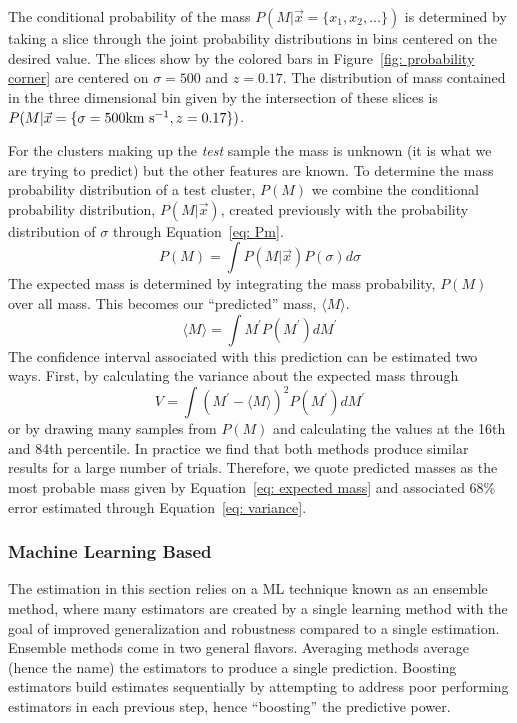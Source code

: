 \documentclass[fleqn,usenatbib]{mnras}
\begin{document}
The conditional probability of the mass $P(M|\vec{x}= \{ x_1,x_2,...\})$ is determined by taking a slice through the joint probability distributions in bins centered on the desired value. The slices show by the colored bars in Figure~\ref{fig: probability corner} are centered on $\sigma = 500$ \kms and $z=0.17$. The distribution of mass contained in the three dimensional bin given by the intersection of these slices is $P(M|\vec{x} = \{ \sigma=500 \hbox{km~s$^{-1}$},z=0.17\})$.

For the clusters making up the \emph{test} sample the mass is unknown (it is what we are trying to predict) but the other features are known. To determine the mass probability distribution of a test cluster, $P(M)$ we combine the conditional probability distribution, $P(M|\vec{x})$, created previously with the probability distribution of $\sigma$ through Equation~\ref{eq: Pm}.
\begin{equation}\label{eq: Pm}
	P(M) = \int P(M|\vec{x}) P(\sigma) d\sigma
\end{equation}
The expected mass is determined by integrating the mass probability, $P(M)$ over all mass. This becomes our ``predicted'' mass, $\langle M\rangle$.
\begin{equation}\label{eq: expected mass}
	\langle M\rangle = \int M^\prime P(M^\prime)dM^\prime
\end{equation}
The confidence interval associated with this prediction can be estimated two ways. First, by calculating the variance about the expected mass through
\begin{equation}\label{eq: variance}
	V = \int (M^\prime - \langle M\rangle)^2 P(M^\prime)dM^\prime
\end{equation}
or by drawing many samples from $P(M)$ and calculating the values at the 16th and 84th percentile. In practice we find that both methods produce similar results for a large number of trials. Therefore, we quote predicted masses as the most probable mass given by Equation~\ref{eq: expected mass} and associated 68\% error estimated through Equation~\ref{eq: variance}.

\subsubsection{Machine Learning Based}\label{sec:machine learning method}
The estimation in this section relies on a ML technique known as an ensemble method, where many estimators are created by a single learning method with the goal of improved generalization and robustness compared to a single estimation. Ensemble methods come in two general flavors. Averaging methods average (hence the name) the estimators to produce a single prediction. Boosting estimators build estimates sequentially by attempting to address poor performing estimators in each previous step, hence ``boosting'' the predictive power.
\end{document}
